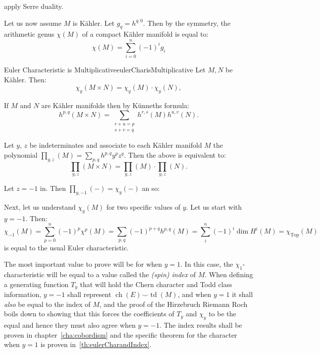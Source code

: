 \documentclass{ut-thesis}
\newenvironment{Proof}[1][]
  {\begin{ProofTcb}[#1]}
  {\end{ProofTcb}}
\newcommand{\ch}{{\operatorname{ch}}}
\newcommand{\Top}{{\operatorname{Top}}}
\newcommand{\td}{{\operatorname{td}}}
\renewcommand{\ch}{{\operatorname{ch}}}
\begin{document}
\begin{Proof}
 apply Serre duality.
\end{Proof}


Let us now assume $M$ is K\"ahler. Let $g_q = h^{q,0}$. Then by the symmetry, the arithmetic genus $\chi(M)$
of a compact K\"ahler manifold is equal to:
\[
  \chi(M) = \sum_{i=0}^n (-1)^ig_i
\]
\begin{prop}{Euler Characteristic is Multiplicative}{eulerCharisMultiplicative}
  Let $M,N$ be K\"ahler. Then:
  \[
    \chi_y(M \times N) = \chi_y(M) \cdot \chi_y(N),
\]
\end{prop}

\begin{Proof}
If $M$ and $N$ are K\"ahler manifolds then by K\"unneths formula:
\[
    h^{p,q}(M \times N) = \sum_{\substack{r+u=p \\ s+v=q}} h^{r,s}(M) h^{u,v}(N).
\]

Let $y$, $z$ be indeterminates and associate to each K\"ahler manifold $M$ the polynomial $\prod_{y,z}(M)
= \sum_{p,q} h^{p,q} y^p z^q$. Then the above is equivalent to:
\[
    \prod_{y,z}(M \times N) = \prod_{y,z}(M) \cdot \prod_{y,z}(N).
\]

Let $z = -1$ in. Then $\prod_{y,-1}(-) = \chi_y(-)$ an so:

\end{Proof}
Next, let us understand $\chi_y(M)$ for two specific values of $y$. Let us start with $y = -1$. Then:
\[
  \chi_{-1}(M) = \sum_{p=0}^n (-1)^p\chi^p(M) = \sum_{p,q} (-1)^{p+q} h^{p,q}(M) = \sum_i^n (-1)^i \dim H^i(M)
  = \chi_\Top(M)
\]
is equal to the usual Euler characteristic.

The most important value to prove will be for when $y = 1$. In this case, the $\chi_{1}$-characteristic will
be equal to a value called the \emph{(spin) index} of $M$. When defining a generating function $T_y$ that
will hold the Chern character and Todd class information, $y = -1$ shall represent $\ch(E)\smile \td(M)$, and when $y = 1$ it shall \emph{also} be equal to the
index of $M$, and the proof of the Hirzebruch Riemann Roch boils down to showing that this forces the
coefficients of $T_y$ and $\chi_y$ to be the equal and hence they must also agree when $y = -1$. The index results
shall be proven in chapter~\ref{cha:cobordism} and the specific theorem for the character when $y=1$ is proven
in~\cref{th:eulerCharandIndex}.
\end{document}
